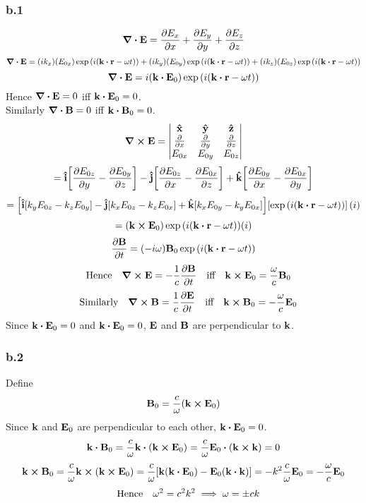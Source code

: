 \subsubsection*{b.1}
\[\div{\vb{E}}=\pdv{E_x}{x}+\pdv{E_y}{y}+\pdv{E_z}{z}\]
\[\div{\vb{E}}=(ik_x)(E_{0x})\exp\qty(i\qty(\vb{k}\vdot\vb{r}-\omega{t}))+(ik_y)(E_{0y})\exp\qty(i\qty(\vb{k}\vdot\vb{r}-\omega{t}))+(ik_z)(E_{0z})\exp\qty(i\qty(\vb{k}\vdot\vb{r}-\omega{t}))\]
\[\div{\vb{E}}=i(\vb{k}\vdot{\vb{E}_0})\exp\qty(i\qty(\vb{k}\vdot\vb{r}-\omega{t}))\]
Hence $\div{\vb{E}}=0$ iff $\vb{k}\vdot\vb{E}_0=0$.\\
Similarly $\div{\vb{B}}=0$ iff $\vb{k}\vdot\vb{B}_0=0$.
\[
\curl{\vb{E}}=
\begin{vmatrix}
\vu{x}& \vu{y}& \vu{z} \\
\pdv{x}& \pdv{y}& \pdv{z} \\
E_{0x}& E_{0y}& E_{0z}
\end{vmatrix}
\]
\[=\vu{i}\qty[\pdv{E_{0z}}{y}-\pdv{E_{0y}}{z}]-\vu{j}\qty[\pdv{E_{0z}}{x}-\pdv{E_{0x}}{z}]+\vu{k}\qty[\pdv{E_{0y}}{x}-\pdv{E_{0x}}{y}]\]
\[=\qty[\vu{i}\qty[k_yE_{0z}-k_zE_{0y}]-\vu{j}\qty[k_xE_{0z}-k_zE_{0x}]+\vu{k}\qty[k_xE_{0y}-k_yE_{0x}]]\qty[\exp\qty(i\qty(\vb{k}\vdot\vb{r}-\omega{t}))](i)\]
\[=\qty(\vb{k}\cp\vb{E}_0)\exp\qty(i\qty(\vb{k}\vdot\vb{r}-\omega{t}))(i)\]
\[\pdv{\vb{B}}{t}=\qty(-i\omega)\vb{B}_0\exp\qty(i\qty(\vb{k}\vdot\vb{r}-\omega{t}))\]
\[\qq{Hence} \curl{\vb{E}}=-\frac{1}{c}\pdv{\vb{B}}{t}\qq{iff} \vb{k}\cp\vb{E}_0=\frac{\omega}{c}\vb{B}_0\]
\[\qq{Similarly} \curl{\vb{B}}=\frac{1}{c}\pdv{\vb{E}}{t}\qq{iff} \vb{k}\cp\vb{B}_0=-\frac{\omega}{c}\vb{E}_0\]
Since $\vb{k}\vdot\vb{E}_0=0$ and $\vb{k}\vdot\vb{E}_0=0$, $\vb{E}$ and $\vb{B}$ are perpendicular to $\vb{k}$.
\subsubsection*{b.2}
Define \[\vb{B}_0=\frac{c}{\omega}\qty(\vb{k}\cp\vb{E}_0)\]
Since $\vb{k}$ and $\vb{E}_0$ are perpendicular to each other, $\vb{k}\vdot\vb{E}_0=0$.
\[\vb{k}\vdot\vb{B}_0=\frac{c}{\omega}\vb{k}\vdot\qty(\vb{k}\cp\vb{E}_0)=\frac{c}{\omega}\vb{E}_0\vdot\qty(\vb{k}\cp\vb{k})=0\]
\[\vb{k}\cp\vb{B}_0=\frac{c}{\omega}\vb{k}\cp\qty(\vb{k}\cp\vb{E}_0)=\frac{c}{\omega}\qty[\vb{k}\qty(\vb{k}\vdot\vb{E}_0)-\vb{E}_0\qty(\vb{k}\vdot\vb{k})]=-k^2\frac{c}{\omega}\vb{E}_0=-\frac{\omega}{c}\vb{E}_0\]
\[\qq{Hence} \omega^2=c^2k^2\implies\omega=\pm ck\]
